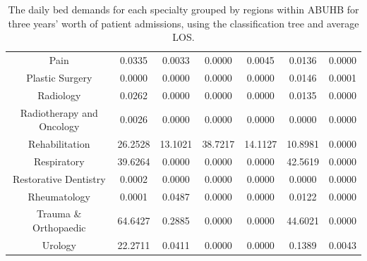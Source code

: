 \documentclass[thesis.tex]{subfiles}
\begin{document}
\begin{table}[h!]
{\begin{tabular}{ccccccc}
Pain&	0.0335&	0.0033&	0.0000&	0.0045&	0.0136&	0.0000\\
Plastic Surgery&	0.0000&	0.0000&	0.0000&	0.0000&	0.0146&	0.0001\\
Radiology&	0.0262&	0.0000&	0.0000&	0.0000&	0.0135&	0.0000\\
Radiotherapy and Oncology&	0.0026	&0.0000&	0.0000&	0.0000&	0.0000&	0.0000\\
Rehabilitation&	26.2528&	13.1021&	38.7217&	14.1127&	10.8981&	0.0000\\
Respiratory&	39.6264&	0.0000&	0.0000&	0.0000&	42.5619&	0.0000\\
Restorative Dentistry&	0.0002&	0.0000&	0.0000&	0.0000&	0.0000&	0.0000\\
Rheumatology&	0.0001&	0.0487&	0.0000&	0.0000&	0.0122&	0.0000\\
Trauma \& Orthopaedic&	64.6427	&0.2885&	0.0000&	0.0000&	44.6021&	0.0000\\
Urology&	22.2711&	0.0411&	0.0000&	0.0000&	0.1389&	0.0043\\
\bottomrule


    \end{tabular}}
    \caption{The daily bed demands for each specialty grouped by regions within ABUHB for three years’ worth of patient admissions, using the classification tree and average LOS.}
    \label{apptab:LinkedDemands6}
\end{table}
\end{document}
